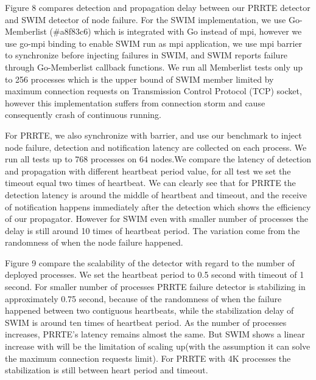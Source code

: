 \documentclass[sigconf]{acmart}
\begin{document}
Figure 8 compares detection and propagation delay between our PRRTE detector and SWIM detector of node failure. For the SWIM implementation, we use Go-Memberlist (\#a8f83c6) which is integrated with Go instead of mpi, however we use go-mpi binding to enable SWIM run as mpi application, we use mpi barrier to synchronize before injecting failures in SWIM, and SWIM reports failure through Go-Memberlist callback functions. We run all Memberlist tests only up to 256 processes which is the upper bound of SWIM member limited by maximum connection requests on Transmission Control Protocol (TCP) socket, however this implementation suffers from connection storm and cause consequently crash of continuous running. 

For PRRTE, we also synchronize with barrier, and use our benchmark to inject node failure, detection and notification latency are collected on each process. We run all tests up to 768 processes on 64 nodes.We compare the latency of detection and propagation with different heartbeat period value, for all test we set the timeout equal two times of heartbeat. We can clearly see that for PRRTE the detection latency is around the middle of heartbeat and timeout, and the receive of notification happens immediately after the detection which shows the efficiency of our propagator. However for SWIM even with smaller number of processes the delay is still around 10 times of heartbeat period. The variation come from the randomness of when the node failure happened.

Figure 9 compare the scalability of the detector with regard to the number of deployed processes. We set the heartbeat period to 0.5 second with timeout of 1 second. For smaller number of processes PRRTE failure detector is stabilizing in approximately 0.75 second, because of the randomness of when the failure happened between two contiguous heartbeats, while the stabilization delay of SWIM is around ten times of heartbeat period. As the number of processes increases, PRRTE's latency remains almost the same. But SWIM shows a linear increase with will be the limitation of scaling up(with the assumption it can solve the maximum connection requests limit). For PRRTE with 4K processes the stabilization is still between heart period and timeout.
\end{document}
